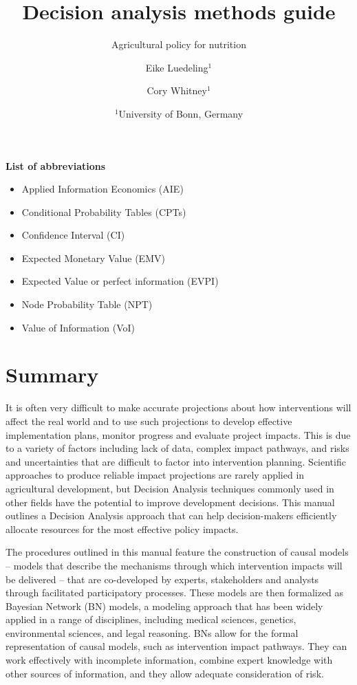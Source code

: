 \documentclass[
]{article}
\title{Decision analysis methods guide}
\subtitle{Agricultural policy for nutrition}
\author{Eike Luedeling\(^1\) \and Cory
Whitney\(^1\) \and \(^1\)University of Bonn, Germany}
\date{}
\begin{document}
\maketitle

\tableofcontents
\listoffigures
\listoftables

\textbf{List of abbreviations}

\begin{itemize}
  \item Applied Information Economics (AIE)
  \item Conditional Probability Tables (CPTs)
  \item Confidence Interval (CI)
  \item Expected Monetary Value (EMV)
  \item Expected Value or perfect information (EVPI)
  \item Node Probability Table (NPT)
  \item Value of Information (VoI)
\end{itemize}

\hypertarget{summary}{%
\section{Summary}\label{summary}}

It is often very difficult to make accurate projections about how
interventions will affect the real world and to use such projections to
develop effective implementation plans, monitor progress and evaluate
project impacts. This is due to a variety of factors including lack of
data, complex impact pathways, and risks and uncertainties that are
difficult to factor into intervention planning. Scientific approaches to
produce reliable impact projections are rarely applied in agricultural
development, but Decision Analysis techniques commonly used in other
fields have the potential to improve development decisions. This manual
outlines a Decision Analysis approach that can help decision-makers
efficiently allocate resources for the most effective policy impacts.

The procedures outlined in this manual feature the construction of
causal models -- models that describe the mechanisms through which
intervention impacts will be delivered -- that are co-developed by
experts, stakeholders and analysts through facilitated participatory
processes. These models are then formalized as Bayesian Network (BN)
models, a modeling approach that has been widely applied in a range of
disciplines, including medical sciences, genetics, environmental
sciences, and legal reasoning. BNs allow for the formal representation
of causal models, such as intervention impact pathways. They can work
effectively with incomplete information, combine expert knowledge with
other sources of information, and they allow adequate consideration of
risk.
\end{document}
